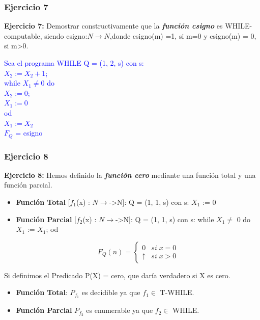 \documentclass[xcolor=table]{beamer}
\begin{document}
\begin{frame}[fragile]\frametitle{Ejercicio 7} \scriptsize

\textbf{Ejercicio 7:}  Demostrar	constructivamente	que	la	\textbf{\textit{función csigno}}	es	WHILE-computable,	siendo	csigno:$N \rightarrow N$,donde csigno(m) =1,	si	m=0	y	csigno(m)	=	0,	si	m>0.
\hspace{0.2cm}

\vspace{0.1cm }\textcolor{blue}{Sea	el	programa	WHILE	Q	=	(1,	2,	s)	con	s:	\\
\hspace{0.2cm }$X_2	:=X_2+1$;\\	
\hspace{0.2cm }while	$X_1	\neq 0$	do\\	
\hspace{0.4cm }$X_2	:=0$;	\\
\hspace{0.4cm }$X_1	:=0$	\\
\hspace{0.2cm }od	\\
\hspace{0.2cm }$X_1	:=X_2$\\	
$F_Q$ =	csigno}

\hspace{0.4cm}


\end{frame}


\begin{frame}[fragile]\frametitle{Ejercicio 8} \scriptsize

\textbf{Ejercicio 8:} Hemos definido la \textbf{\textit{función cero}} mediante una función total y una función parcial.
\hspace{0.2cm}

\begin{itemize}
    \item \textbf{Función Total} [$f_1$(x) : $N \rightarrow$->N]:  Q = (1,	1,	s)	con	s:	$X_1$	:=	0
    \item \textbf{Función Parcial} [$f_2$(x) : $N \rightarrow$->N]:  Q = (1,	1,	s)	con	s:	while $X_1 \neq$ 0 do $X_1$ := $X_1$; od

\[F_Q(n) = \left\{ \begin{array}{lr} 0 & si\; x = 0\\  \uparrow & si\; x > 0 \end{array} \right. \]

\end{itemize}

Si definimos el Predicado P(X) = cero, que daría verdadero si X es cero.


\begin{itemize}
    \item \textbf{Función Total}: $P_{f_1}$  es decidible ya que $f_1 \in$ T-WHILE.
    \item \textbf{Función Parcial} $P_{f_2}$  es enumerable ya que $f_2 \in$ WHILE.

\end{itemize}

\end{frame}
\end{document}
